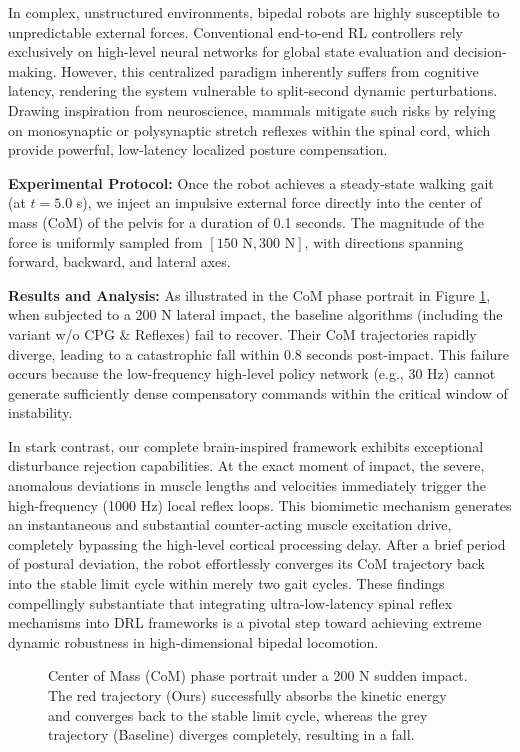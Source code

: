 \documentclass[lettersize,journal]{IEEEtran}
\begin{document}
In complex, unstructured environments, bipedal robots are highly susceptible to unpredictable external forces. 
Conventional end-to-end RL controllers rely exclusively on high-level neural networks for global state evaluation and decision-making. 
However, this centralized paradigm inherently suffers from cognitive latency, rendering the system vulnerable to split-second dynamic perturbations. 
Drawing inspiration from neuroscience, mammals mitigate such risks by relying on monosynaptic or polysynaptic stretch reflexes within the spinal cord, which provide powerful, low-latency localized posture compensation.

\textbf{Experimental Protocol:} Once the robot achieves a steady-state walking gait (at $t = 5.0$ s), we inject an impulsive external force directly into the center of mass (CoM) of the pelvis for a duration of 0.1 seconds. 
The magnitude of the force is uniformly sampled from $[150 \text{ N}, 300 \text{ N}]$, with directions spanning forward, backward, and lateral axes.

\textbf{Results and Analysis:} As illustrated in the CoM phase portrait in Figure \ref{fig:robustness}, when subjected to a 200 N lateral impact, the baseline algorithms (including the variant w/o CPG \& Reflexes) fail to recover. 
Their CoM trajectories rapidly diverge, leading to a catastrophic fall within 0.8 seconds post-impact. 
This failure occurs because the low-frequency high-level policy network (e.g., 30 Hz) cannot generate sufficiently dense compensatory commands within the critical window of instability.

In stark contrast, our complete brain-inspired framework exhibits exceptional disturbance rejection capabilities. 
At the exact moment of impact, the severe, anomalous deviations in muscle lengths and velocities immediately trigger the high-frequency (1000 Hz) local reflex loops. 
This biomimetic mechanism generates an instantaneous and substantial counter-acting muscle excitation drive, completely bypassing the high-level cortical processing delay. 
After a brief period of postural deviation, the robot effortlessly converges its CoM trajectory back into the stable limit cycle within merely two gait cycles. 
These findings compellingly substantiate that integrating ultra-low-latency spinal reflex mechanisms into DRL frameworks is a pivotal step toward achieving extreme dynamic robustness in high-dimensional bipedal locomotion.

\begin{figure}[htbp]
    \centering
    \caption{Center of Mass (CoM) phase portrait under a 200 N sudden impact. The red trajectory (Ours) successfully absorbs the kinetic energy and converges back to the stable limit cycle, whereas the grey trajectory (Baseline) diverges completely, resulting in a fall.}
    \label{fig:robustness}
\end{figure}




\end{document}

